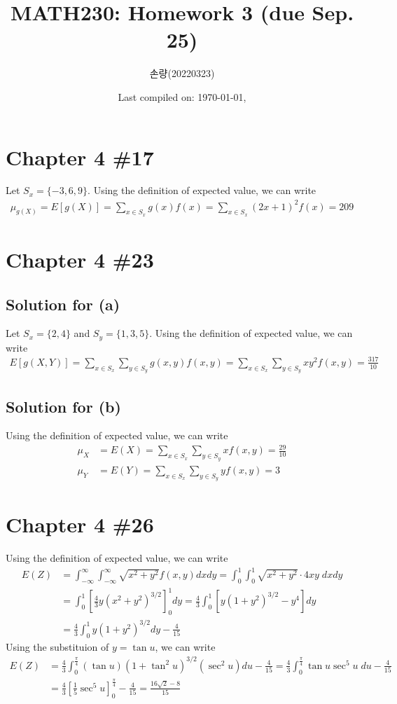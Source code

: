 \documentclass{scrartcl}
\title{MATH230: Homework 3 (due Sep. 25)}
\author{손량(20220323)}
\date{Last compiled on: \today, \currenttime}
\begin{document}
\maketitle

\section{Chapter 4 \#17}
Let \(S_x = \{-3, 6, 9\}\). Using the definition of expected value, we can
write
\begin{align*}
  \mu_{g(X)} = E[g(X)] = \sum_{x \in S_x} g(x) f(x)
  = \sum_{x \in S_x} (2x + 1)^2 f(x) = 209
\end{align*}

\section{Chapter 4 \#23}
\subsection{Solution for (a)}
Let \(S_x = \{2, 4\}\) and \(S_y = \{1, 3, 5\}\). Using the definition of
expected value, we can write
\begin{align*}
  E[g(X, Y)] = \sum_{x \in S_x} \sum_{y \in S_y} g(x, y) f(x, y)
  = \sum_{x \in S_x} \sum_{y \in S_y} xy^2 f(x, y) = \frac{317}{10}
\end{align*}

\subsection{Solution for (b)}
Using the definition of expected value, we can write
\begin{align*}
  \mu_X &= E(X) = \sum_{x \in S_x} \sum_{y \in S_y} x f(x, y)
  = \frac{29}{10} \\
  \mu_Y &= E(Y) = \sum_{x \in S_x} \sum_{y \in S_y} y f(x, y) = 3
\end{align*}

\section{Chapter 4 \#26}
Using the definition of expected value, we can write
\begin{align*}
  E(Z)
  &= \int^\infty_{-\infty} \int^\infty_{-\infty} \sqrt{x^2 + y^2} f(x, y) dx dy
  = \int^1_0 \int^1_0 \sqrt{x^2 + y^2} \cdot 4xy\; dx dy \\
  &= \int^1_0 \left[ \frac{4}{3} y (x^2 + y^2)^{3/2} \right]^1_0 dy
  = \frac{4}{3} \int^1_0 \left[ y(1 + y^2)^{3 / 2} - y^4 \right] dy \\
  &= \frac{4}{3} \int^1_0 y(1 + y^2)^{3 / 2} dy - \frac{4}{15}
\end{align*}
Using the substituion of \(y = \tan u\), we can write
\begin{align*}
  E(Z)
  &= \frac{4}{3}
  \int^\frac{\pi}{4}_0 (\tan u) (1 + \tan^2 u)^{3 / 2} (\sec^2 u) du
  - \frac{4}{15}
  = \frac{4}{3} \int^\frac{\pi}{4}_0 \tan u \sec^5 u\; du
  - \frac{4}{15} \\
  &= \frac{4}{3} \left[ \frac{1}{5} \sec^5 u \right]^\frac{\pi}{4}_0
  - \frac{4}{15}
  = \frac{16\sqrt{2} - 8}{15}
\end{align*}
\end{document}

